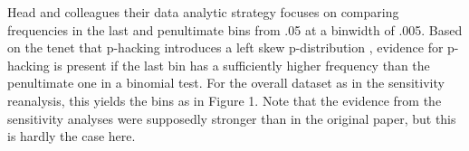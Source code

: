 Head and colleagues their data analytic strategy focuses on comparing frequencies in the last and penultimate bins from .05 at a binwidth of .005. Based on the tenet that p-hacking introduces a left skew p-distribution \cite{Simonsohn2014}, evidence for p-hacking is present if the last bin has a sufficiently higher frequency than the penultimate one in a binomial test. For the overall dataset as in the sensitivity reanalysis, this yields the bins as in Figure 1. Note that the evidence from the sensitivity analyses were supposedly stronger than in the original paper, but this is hardly the case here.  